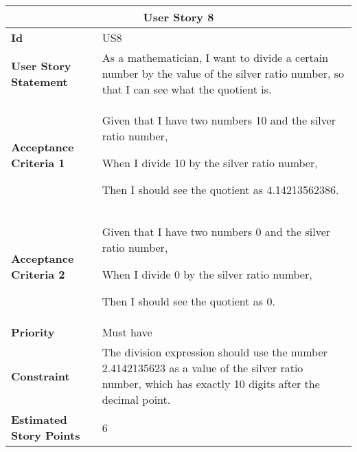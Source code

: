 \hspace{1cm}
\begin{center}
\begin{tabular}{ | m{2cm} | m{12cm} | } 

 \hline
 \multicolumn{2}{|c|}{\textbf{User Story 8}} \\

\hline
\textbf{Id} & US8 \\ 

\hline
\textbf{User Story Statement} & As a mathematician, I want to divide a certain number by the value of the silver ratio number, so that I can see what the quotient is.\\ 

\hline
\textbf{Acceptance Criteria 1} & Given that I have two numbers 10 and the silver ratio number, 

When I divide 10 by the silver ratio number,

Then I should see the quotient as 4.14213562386.\\ 

\hline
\textbf{Acceptance Criteria 2} & Given that I have two numbers 0 and the silver ratio number, 

When I divide 0 by the silver ratio number,

Then I should see the quotient as 0.\\ 

\hline
\textbf{Priority} & Must have \\ 

\hline
\textbf{Constraint} & The division expression should use the number 2.4142135623 as a value of the silver ratio number, which has exactly 10 digits after the decimal point.\\ 

\hline
\textbf{Estimated Story Points} & 6 \\ 
\hline

\end{tabular}
\end{center}

